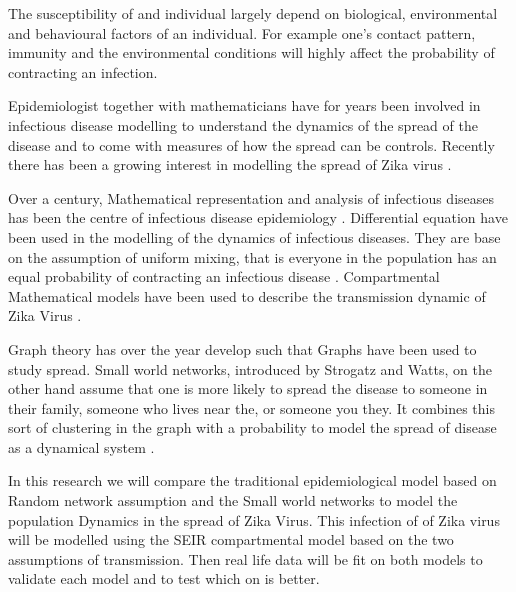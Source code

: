 The susceptibility of and individual largely depend on biological, environmental and behavioural factors of an individual. For example one's contact pattern, immunity and the environmental conditions will highly affect the probability of contracting an infection.

Epidemiologist together with mathematicians have for years been involved in infectious disease modelling to understand the dynamics of the spread of the disease and to come with measures of how the spread can be controls. Recently there has been a growing interest in modelling the spread of Zika virus \citep{ku2016}.

Over a  century, Mathematical representation and analysis of infectious diseases has been the centre of  infectious disease epidemiology \citep{b2005}. Differential equation have been used in the modelling of the dynamics of infectious diseases. They are base on the assumption of uniform mixing, that is everyone in the population has an equal probability of contracting an infectious disease \citep{kaplan2002emergency}.
Compartmental Mathematical models have been used to describe the transmission dynamic of Zika Virus \citep{gao2016}.

Graph theory has over the year develop such that Graphs have been used to study spread.  Small world networks, introduced by Strogatz and Watts, on the other
hand assume that one is more likely to spread the disease to someone in their family, someone
who lives near the, or someone you they. It combines this sort of clustering in the graph with a probability to model the spread of disease as a dynamical system \citep{newman2001random}.


In this research we will compare the traditional epidemiological model based on Random network assumption and the Small world networks to model the population Dynamics in the spread of Zika Virus. This infection of of Zika virus will be modelled using the SEIR compartmental model based on the two assumptions of transmission. Then real life data will be fit on both models to validate each model and to test which on is better.

